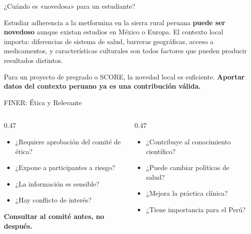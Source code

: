 \documentclass[12pt, aspectratio=169]{beamer}
\begin{document}
\begin{frame}{¿Cuándo es «novedosa» para un estudiante?}
  \begin{examplebox}
    \small
    Estudiar adherencia a la metformina en la sierra rural peruana
    \textbf{puede ser novedoso} aunque existan estudios en México o Europa.
    El contexto local importa: diferencias de sistema de salud, barreras
    geográficas, acceso a medicamentos, y características culturales
    son todos factores que pueden producir resultados distintos.
  \end{examplebox}

  \medskip
  \begin{keybox}
    \small
    Para un proyecto de pregrado o SCORE, la novedad local es suficiente.
    \textbf{Aportar datos del contexto peruano ya es una contribución válida.}
  \end{keybox}
\end{frame}

\begin{frame}{FINER: Ética y Relevante}
  \begin{columns}[T]
    \begin{column}{0.47\textwidth}
      \begin{keybox}[E — Ética]
        \small
        \begin{itemize}
          \item ¿Requiere aprobación del comité de ética?
          \item ¿Expone a participantes a riesgo?
          \item ¿La información es sensible?
          \item ¿Hay conflicto de interés?
        \end{itemize}
        \vspace{3pt}
        \textbf{Consultar al comité antes, no después.}
      \end{keybox}
    \end{column}
    \begin{column}{0.47\textwidth}
      \begin{keybox}[R — Relevante]
        \small
        \begin{itemize}
          \item ¿Contribuye al conocimiento científico?
          \item ¿Puede cambiar políticas de salud?
          \item ¿Mejora la práctica clínica?
          \item ¿Tiene importancia para el Perú?
        \end{itemize}
      \end{keybox}
    \end{column}
  \end{columns}
\end{frame}
\end{document}
